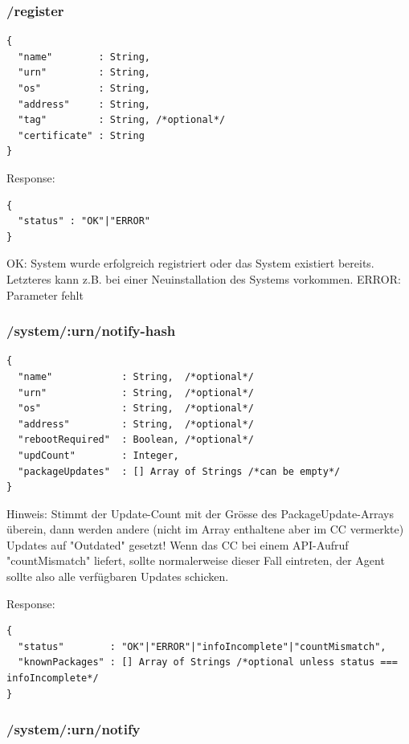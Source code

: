 \subsubsection{/register}

\begin{verbatim}
{
  "name"        : String,
  "urn"         : String,
  "os"          : String,
  "address"     : String,
  "tag"         : String, /*optional*/
  "certificate" : String
}
\end{verbatim}

Response:

\begin{verbatim}
{
  "status" : "OK"|"ERROR" 
}
\end{verbatim}

OK: System wurde erfolgreich registriert oder das System existiert bereits. Letzteres kann z.B. bei einer Neuinstallation des Systems vorkommen.
ERROR: Parameter fehlt

\subsubsection{/system/:urn/notify-hash}

\begin{verbatim}
{
  "name"            : String,  /*optional*/
  "urn"             : String,  /*optional*/
  "os"              : String,  /*optional*/
  "address"         : String,  /*optional*/
  "rebootRequired"  : Boolean, /*optional*/
  "updCount"        : Integer,
  "packageUpdates"  : [] Array of Strings /*can be empty*/
}
\end{verbatim}

Hinweis: Stimmt der Update-Count mit der Grösse des PackageUpdate-Arrays überein, dann werden andere (nicht im Array enthaltene aber im CC vermerkte) Updates auf "Outdated" gesetzt! Wenn das CC bei einem API-Aufruf "countMismatch" liefert, sollte normalerweise dieser Fall eintreten, der Agent sollte also alle verfügbaren Updates schicken.

Response: 

\begin{verbatim}
{
  "status"        : "OK"|"ERROR"|"infoIncomplete"|"countMismatch",
  "knownPackages" : [] Array of Strings /*optional unless status === infoIncomplete*/
}
\end{verbatim}

\subsubsection{/system/:urn/notify}

